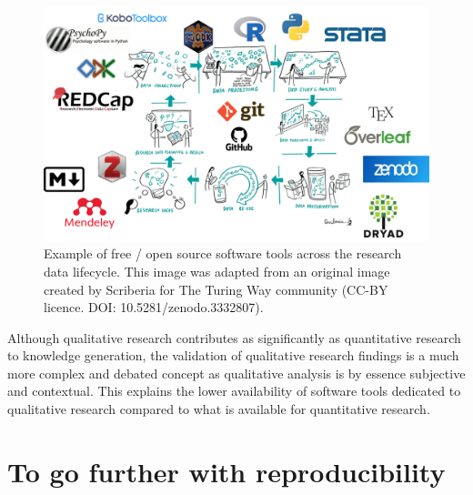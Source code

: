 \documentclass[
  letterpaper,
  DIV=11,
  numbers=noendperiod,
  oneside]{scrreprt}
\begin{document}
\begin{figure}

{\centering \includegraphics{images/paste-AF117E41.png}

}

\caption{\label{fig-software-tools-across-research-lifecycle}Example of
free / open source software tools across the research data lifecycle.
This image was adapted from an original image created by Scriberia for
The Turing Way community (CC-BY licence. DOI: 10.5281/zenodo.3332807).}

\end{figure}

\begin{tcolorbox}[enhanced jigsaw, coltitle=black, opacityback=0, title=\textcolor{quarto-callout-note-color}{\faInfo}\hspace{0.5em}{Note}, toprule=.15mm, bottomtitle=1mm, colbacktitle=quarto-callout-note-color!10!white, colframe=quarto-callout-note-color-frame, left=2mm, opacitybacktitle=0.6, bottomrule=.15mm, arc=.35mm, toptitle=1mm, colback=white, titlerule=0mm, breakable, leftrule=.75mm, rightrule=.15mm]

Although qualitative research contributes as significantly as
quantitative research to knowledge generation, the validation of
qualitative research findings is a much more complex and debated concept
as qualitative analysis is by essence subjective and contextual. This
explains the lower availability of software tools dedicated to
qualitative research compared to what is available for quantitative
research.

\end{tcolorbox}

\hypertarget{to-go-further-with-reproducibility}{%
\section{To go further with
reproducibility}\label{to-go-further-with-reproducibility}}
\end{document}
